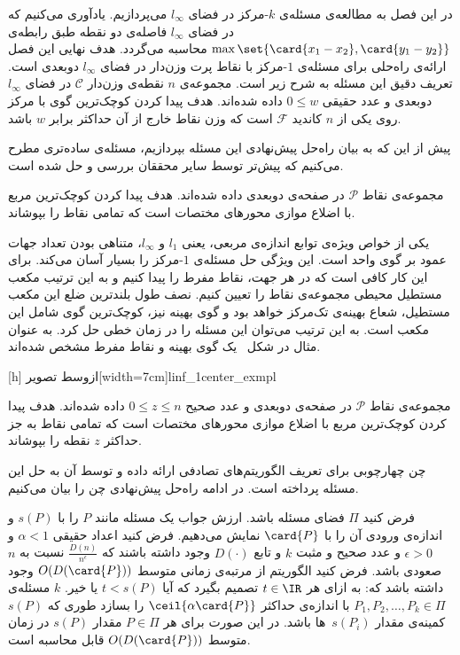 در این فصل به مطالعه‌ی مسئله‌ی $k$-مرکز در فضای $l_\infty$ می‌پردازیم. یادآوری می‌کنیم که در فضای $l_\infty$ فاصله‌ی دو نقطه طبق رابطه‌ی
$\max\set{\card{x_1 - x_2}, \card{y_1 - y_2}}$
محاسبه می‌گردد. هدف نهایی این فصل ارائه‌ی راه‌حلی برای مسئله‌ی $1$-مرکز با نقاط پرت وزن‌دار در فضای $l_\infty$ دوبعدی است. تعریف دقیق این مسئله به شرح زیر است.
مجموعه‌ی $n$ نقطه‌ی وزن‌دار $\mathcal{C}$ در فضای $l_\infty$ دوبعدی و عدد حقیقی $0 \leq w$ داده شده‌اند. هدف پیدا کردن کوچک‌ترین گوی با مرکز روی یکی از $n$ کاندید $\mathcal{F}$ است که وزن نقاط خارج از آن حداکثر برابر $w$ باشد.

پیش از این که به بیان راه‌حل پیش‌نهادی این مسئله بپردازیم، مسئله‌ی ساده‌تری مطرح می‌کنیم که پیش‌تر توسط سایر محققان بررسی و حل شده است.

مجموعه‌ی نقاط $\mathcal{P}$ در صفحه‌ی دوبعدی داده شده‌اند. هدف پیدا کردن کوچک‌ترین مربع با اضلاع موازی محورهای مختصات است که تمامی نقاط را بپوشاند.

یکی از خواص ویژه‌ی توابع اندازه‌ی مربعی، یعنی
$l_1$
و
$l_\infty$،
متناهی بودن تعداد جهات عمود بر گوی واحد است. این ویژگی حل مسئله‌ی $1$-مرکز را بسیار آسان می‌کند. برای این کار کافی است که در هر جهت، نقاط مفرط را پیدا کنیم و به این ترتیب مکعب مستطیل محیطی مجموعه‌ی نقاط را تعیین کنیم. نصف طول بلندترین ضلع این مکعب مستطیل، شعاع بهینه‌ی تک‌مرکز خواهد بود و گوی بهینه نیز، کوچک‌ترین گوی شامل این مکعب است. به این ترتیب می‌توان این مسئله را در زمان خطی حل کرد. به عنوان مثال در شکل~ یک گوی بهینه و نقاط مفرط مشخص شده‌اند.

[h]
‌ازوسط
‌تصویر[width=7cm]{linf_1center_exmpl}



مجموعه‌ی نقاط $\mathcal{P}$ در صفحه‌ی دوبعدی و عدد صحیح $0 \leq z \leq n$ داده شده‌اند. هدف پیدا کردن کوچک‌ترین مربع با اضلاع موازی محورهای مختصات است که تمامی نقاط به جز حداکثر $z$ نقطه را بپوشاند.

چن \cite{chan1999geometric} چهارچوبی برای تعریف الگوریتم‌های تصادفی ارائه داده و توسط آن به حل این مسئله پرداخته است. در ادامه راه‌حل پیش‌نهادی چن را بیان می‌کنیم.

فرض کنید $\Pi$ فضای مسئله باشد. ارزش جواب یک مسئله مانند $P$ را با $s(P)$ و اندازه‌ی ورودی آن را با $\card{P}$ نمایش می‌دهیم. فرض کنید اعداد حقیقی $\alpha < 1$ و $\epsilon > 0$ و عدد صحیح و مثبت $k$ و تابع $D(\cdot)$ وجود داشته باشند که
$\frac{D(n)}{n^\epsilon}$
نسبت به $n$ صعودی باشد. فرض کنید الگوریتم از مرتبه‌ی زمانی متوسط $O(D(\card{P}))$ وجود داشته باشد که:
 به ازای هر $t \in \IR$ تصمیم بگیرد که آیا $t < s(P)$ یا خیر.
 $k$ مسئله‌ی
$P_1, P_2, \ldots, P_k \in \Pi$
با اندازه‌ی حداکثر
$\ceil{\alpha\card{P}}$
را بسازد طوری که $s(P)$ کمینه‌ی مقدار $s(P_i)$~ها باشد.
در این صورت برای هر $P \in \Pi$ مقدار $s(P)$ در زمان متوسط
$O(D(\card{P}))$
قابل محاسبه است.


